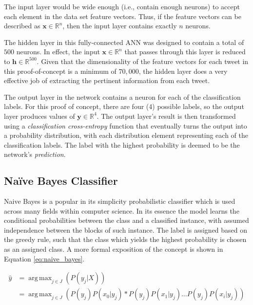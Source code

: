 \documentclass[conference]{sig-alternate-05-2015}
\DeclareMathOperator*{\argmax}{arg\,max}
\begin{document}
The input layer would be wide enough (i.e., contain enough
neurons) to accept each element in the data set feature vectors. Thus, if the
feature vectors can be described as $\textbf{x} \in \mathbb{R}^n$, then the
input layer contains exactly $n$ neurons. 

The hidden layer in this fully-connected ANN was designed to contain a total of
$500$ neurons. In effect, the input $\textbf{x} \in \mathbb{R}^n$ that passes
through this layer is reduced to $\textbf{h} \in \mathbb{R}^{500}$. Given that
the dimensionality of the feature vectors for each tweet in this
proof-of-concept is a minimum of $70,000$, the hidden layer does a very
effective job of extracting the pertinent information from each tweet.

The output layer in the network contains a neuron for each of the classification
labels. For this proof of concept, there are four (4) possible labels, so the
output layer produces values of $\textbf{y} \in \mathbb{R}^4$. The output
layer's result is then transformed using a \textit{classification cross-entropy}
function that eventually turns the output into a probability distribution, with
each distribution element representing each of the classification labels. The
label with the highest probability is deemed to be the network's
\textit{prediction}.

\subsection{Na\"ive Bayes Classifier}\label{subsec:naive_bayes_classifer}

Naive Bayes is a popular in its simplicity probabilistic classifier which is
used across many fields within computer science. In its essence the model learns
the conditional probabilities between the class and a classified instance, with
assumed independence between the blocks of such instance. The label is assigned
based on the greedy rule, such that the class which yields the highest
probability is chosen as an assigned class. A more formal exposition of the
concept is shown in Equation \ref{eq:naive_bayes}.

\begin{equation}
  \label{eq:naive_bayes}
  \begin{aligned}
    \hat{y}&=\argmax_{j \in J}(P(y_j|X)) \\
    &=\argmax_{j\in J}(P(y_j)P(x_0 | y_j) * P(y_j)P(x_1 | y_j) \ldots P(y_j)P(x_i | y_j) )
  \end{aligned}
\end{equation}
\end{document}
